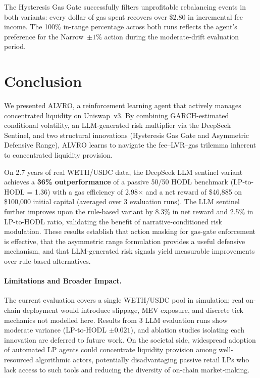 \documentclass{article}
\begin{document}
The Hysteresis Gas Gate successfully filters unprofitable rebalancing events in
both variants: every dollar of gas spent recovers over \$2.80 in incremental fee
income.  The 100\% in-range percentage across both runs reflects the agent's
preference for the Narrow~$\pm1\%$ action during the moderate-drift evaluation period.

\section{Conclusion}

We presented ALVRO, a reinforcement learning agent that actively manages
concentrated liquidity on Uniswap~v3.  By combining GARCH-estimated
conditional volatility, an LLM-generated risk multiplier via the DeepSeek
Sentinel, and two structural innovations (Hysteresis Gas Gate and Asymmetric
Defensive Range), ALVRO learns to navigate the fee--LVR--gas trilemma
inherent to concentrated liquidity provision.

On 2.7 years of real WETH/USDC data, the DeepSeek LLM sentinel variant
achieves a \textbf{36\% outperformance} of a passive 50/50 HODL benchmark
(LP-to-HODL = 1.36) with a gas efficiency of 2.98$\times$ and a net reward
of \$46{,}885 on \$100{,}000 initial capital (averaged over 3 evaluation runs).
The LLM sentinel further improves upon the rule-based variant by 8.3\% in
net reward and 2.5\% in LP-to-HODL ratio, validating the benefit of
narrative-conditioned risk modulation.  These results establish that action
masking for gas-gate enforcement is effective, that the asymmetric range
formulation provides a useful defensive mechanism, and that LLM-generated
risk signals yield measurable improvements over rule-based alternatives.

\paragraph{Limitations and Broader Impact.}
The current evaluation covers a single WETH/USDC pool in simulation; real
on-chain deployment would introduce slippage, MEV exposure, and discrete tick
mechanics not modelled here.  Results from 3 LLM evaluation runs show moderate
variance (LP-to-HODL $\pm 0.021$), and ablation studies isolating each
innovation are deferred to future work.
On the societal side, widespread adoption of automated LP agents could
concentrate liquidity provision among well-resourced algorithmic actors,
potentially disadvantaging passive retail LPs who lack access to such tools
and reducing the diversity of on-chain market-making.
\end{document}
